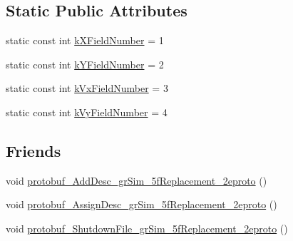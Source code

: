 \subsection*{Static Public Attributes}
\begin{DoxyCompactItemize}
\item 
static const int \hyperlink{classgr_sim___ball_replacement_aa4e93b189961c20d209fe7df30cee1e2}{k\-X\-Field\-Number} = 1
\item 
static const int \hyperlink{classgr_sim___ball_replacement_a031dc94d2fd8627edac8d7c1a411beef}{k\-Y\-Field\-Number} = 2
\item 
static const int \hyperlink{classgr_sim___ball_replacement_a5471a4f71ff71ef8d0b851c47a457702}{k\-Vx\-Field\-Number} = 3
\item 
static const int \hyperlink{classgr_sim___ball_replacement_a04c1beed02b84db93300aca559111a40}{k\-Vy\-Field\-Number} = 4
\end{DoxyCompactItemize}
\subsection*{Friends}
\begin{DoxyCompactItemize}
\item 
void \hyperlink{classgr_sim___ball_replacement_a9ac32e27f85f830ef01942ad673705b7}{protobuf\-\_\-\-Add\-Desc\-\_\-gr\-Sim\-\_\-5f\-Replacement\-\_\-2eproto} ()
\item 
void \hyperlink{classgr_sim___ball_replacement_a973404afe16402ca581cbe74d3e0a674}{protobuf\-\_\-\-Assign\-Desc\-\_\-gr\-Sim\-\_\-5f\-Replacement\-\_\-2eproto} ()
\item 
void \hyperlink{classgr_sim___ball_replacement_a495a36d90087973987ea2ddca30870c8}{protobuf\-\_\-\-Shutdown\-File\-\_\-gr\-Sim\-\_\-5f\-Replacement\-\_\-2eproto} ()
\end{DoxyCompactItemize}


